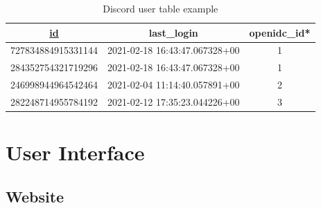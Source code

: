 \begin{table}[H]
	\centering
	\small
	\setlength\tabcolsep{2pt}
	\begin{tabular}{|c|c|c|}
		\hline
		\underline{id}                 & last\_login                   & openidc\_id* \\
		\hline
		727834884915331144 & 2021-02-18 16:43:47.067328+00 & 1           \\
		284352754321719296 & 2021-02-18 16:43:47.067328+00 & 1           \\
		246998944964542464 & 2021-02-04 11:14:40.057891+00 & 2           \\
		282248714955784192 & 2021-02-12 17:35:23.044226+00 & 3           \\
		\hline
	\end{tabular}
	\caption{Discord user table example}
	\label{tab:dis-table}
\end{table}

\section{User Interface}

\subsection{Website}

